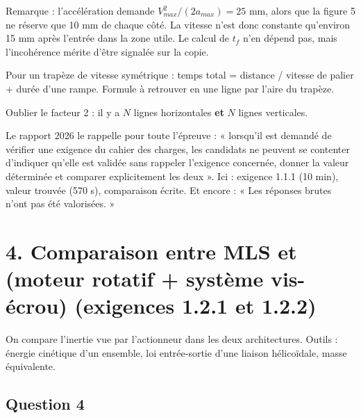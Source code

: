 \documentclass[11pt,a4paper]{article}
\begin{document}
Remarque : l'accélération demande \(V_{max}^2/(2a_{max})=25\) mm, alors que la figure 5 ne réserve que 10 mm de chaque côté. La vitesse n'est donc constante qu'environ 15 mm après l'entrée dans la zone utile. Le calcul de \(t_f\) n'en dépend pas, mais l'incohérence mérite d'être signalée sur la copie.

\begin{methode}

Pour un trapèze de vitesse symétrique : temps total = distance / vitesse de palier + durée d'une rampe. Formule à retrouver en une ligne par l'aire du trapèze.

\end{methode}

\begin{piege}

Oublier le facteur 2 : il y a \(N\) lignes horizontales \textbf{et} \(N\) lignes verticales.

\end{piege}

\begin{jury}

Le rapport 2026 le rappelle pour toute l'épreuve : « lorsqu'il est demandé de vérifier une exigence du cahier des charges, les candidats ne peuvent se contenter d'indiquer qu'elle est validée sans rappeler l'exigence concernée, donner la valeur déterminée et comparer explicitement les deux ». Ici : exigence 1.1.1 (10 min), valeur trouvée (570 s), comparaison écrite. Et encore : « Les réponses brutes n'ont pas été valorisées. »

\end{jury}

\hypertarget{comparaison-entre-mls-et-moteur-rotatif-systuxe8me-vis-uxe9crou-exigences-1.2.1-et-1.2.2}{%
\section{4. Comparaison entre MLS et (moteur rotatif + système vis-écrou) (exigences 1.2.1 et 1.2.2)}\label{comparaison-entre-mls-et-moteur-rotatif-systuxe8me-vis-uxe9crou-exigences-1.2.1-et-1.2.2}}

On compare l'inertie vue par l'actionneur dans les deux architectures. Outils : énergie cinétique d'un ensemble, loi entrée-sortie d'une liaison hélicoïdale, masse équivalente.

\hypertarget{question-4}{%
\subsection{Question 4}\label{question-4}}
\end{document}
